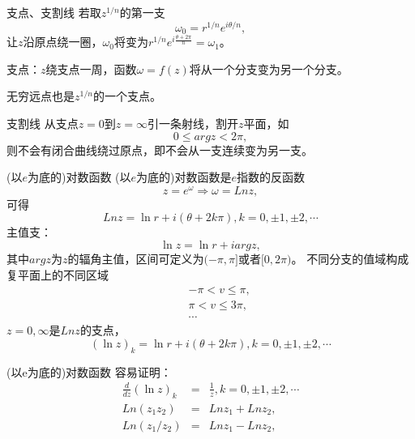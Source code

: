 \documentclass[11pt]{beamer}
\newcommand{\kong}[1][0.5]{\vspace{#1cm}}
\begin{document}
\begin{frame}{支点、支割线}
若取$z^{1/n}$的第一支
\begin{equation}
\omega_0 = r^{1/n} e^{i \theta/n},
\end{equation}
让$z$沿原点绕一圈，$\omega_0$将变为$r^{1/n}e^{i \frac{\theta + 2\pi}{n} }　= \omega_1$。

\kong[0.5]
支点：$z$绕支点一周，函数$\omega=f(z)$将从一个分支变为另一个分支。

\kong[0.5]
无穷远点也是$z^{1/n}$的一个支点。

\end{frame}

\begin{frame}{支割线}
从支点$z=0$到$z=\infty$引一条射线，割开$z$平面，如
\begin{equation}
0 \leq arg z < 2\pi,
\end{equation}
则不会有闭合曲线绕过原点，即不会从一支连续变为另一支。
\end{frame}

\begin{frame}{(以$e$为底的)对数函数}
(以$e$为底的)对数函数是$e$指数的反函数
\begin{equation}
z = e^\omega \Rightarrow \omega = Ln z,
\end{equation}
可得
\begin{equation}
Ln z = \ln r + i(\theta + 2k\pi), k = 0, \pm 1, \pm 2, \cdots
\end{equation}
主值支：
\begin{equation}
\ln z = \ln r + i arg z,
\end{equation}
其中$arg z$为$z$的辐角主值，区间可定义为$(-\pi, \pi]$或者$[0,2\pi)$。
不同分支的值域构成复平面上的不同区域
\begin{eqnarray}
&& -\pi < v \leq \pi, \\
&& \pi < v \leq 3 \pi, \\
&& \cdots
\end{eqnarray}
$z=0, \infty$是$Ln z$的支点，
\begin{equation}
(\ln z)_k = \ln r + i(\theta + 2k\pi), k=0, \pm 1, \pm 2, \cdots
\end{equation}
\end{frame}

\begin{frame}{(以e为底的)对数函数}
容易证明：
\begin{eqnarray}
\frac{d}{dz}(\ln z)_k &=& \frac{1}{z}, k=0, \pm 1, \pm 2, \cdots \\
Ln (z_1 z_2) &=& Ln z_1 + Ln z_2, \\
Ln (z_1 / z_2) &=& Ln z_1 - Ln z_2,
\end{eqnarray}
\end{frame}
\end{document}
